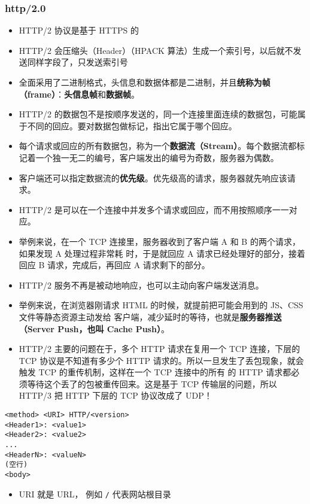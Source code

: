 \subsubsection{http/2.0}
\begin{itemize}
\item HTTP/2 协议是基于 HTTPS 的
\item HTTP/2 会压缩头（Header）（HPACK 算法）生成一个索引号，以后就不发送同样字段了，只发送索引号
\item 全面采用了二进制格式，头信息和数据体都是二进制，并且\textbf{统称为帧（frame）}：\textbf{头信息帧}和\textbf{数据帧}。
\item HTTP/2 的数据包不是按顺序发送的，同一个连接里面连续的数据包，可能属于不同的回应。要对数据包做标记，指出它属于哪个回应。
\item 每个请求或回应的所有数据包，称为一个\textbf{数据流（Stream）}。每个数据流都标记着一个独一无二的编号，客户端发出的编号为奇数，服务器为偶数。
\item 客户端还可以指定数据流的\textbf{优先级}。优先级高的请求，服务器就先响应该请求。
\item HTTP/2 是可以在一个连接中并发多个请求或回应，而不用按照顺序一一对应。
\item 举例来说，在一个 TCP 连接里，服务器收到了客户端 A 和 B 的两个请求，如果发现 A 处理过程非常耗 时，于是就回应 A 请求已经处理好的部分，接着回应 B 请求，完成后，再回应 A 请求剩下的部分。
\item HTTP/2 服务不再是被动地响应，也可以主动向客户端发送消息。
\item 举例来说，在浏览器刚请求 HTML 的时候，就提前把可能会用到的 JS、CSS 文件等静态资源主动发给 客户端，减少延时的等待，也就是\textbf{服务器推送（Server Push，也叫 Cache Push）}。
\item HTTP/2 主要的问题在于，多个 HTTP 请求在复用一个 TCP 连接，下层的 TCP 协议是不知道有多少个 HTTP 请求的。所以一旦发生了丢包现象，就会触发 TCP 的重传机制，这样在一个 TCP 连接中的所有 的 HTTP 请求都必须等待这个丢了的包被重传回来。这是基于 TCP 传输层的问题，所以  HTTP/3 把 HTTP 下层的 TCP 协议改成了 UDP！
\end{itemize}

\begin{lstlisting}[language=none]
<method> <URI> HTTP/<version>
<Header1>: <value1>
<Header2>: <value2>
...
<HeaderN>: <valueN>
(空行)
<body>
\end{lstlisting}

\begin{itemize}
\item URI 就是 URL， 例如 \verb`/` 代表网站根目录
\end{itemize}

